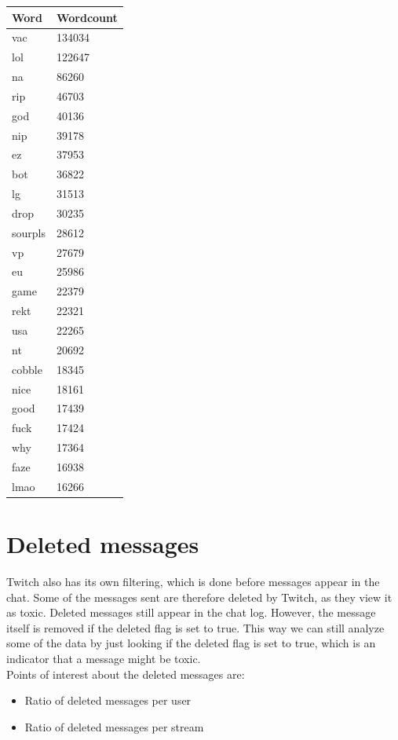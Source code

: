 \documentclass[final]{report}
\begin{document}
\begin{minipage}{.5\textwidth}
\centering
{}
\label{wordcounttabel}
\begin{tabular}{|l|l|}
\hline
Word    & Wordcount \\ \hline
vac     & 134034    \\ \hline
lol     & 122647    \\ \hline
na      & 86260     \\ \hline
rip     & 46703     \\ \hline
god     & 40136     \\ \hline
nip     & 39178     \\ \hline
ez      & 37953     \\ \hline
bot     & 36822     \\ \hline
lg      & 31513     \\ \hline
drop    & 30235     \\ \hline
sourpls & 28612     \\ \hline
vp      & 27679     \\ \hline
eu      & 25986     \\ \hline
game    & 22379     \\ \hline
rekt    & 22321     \\ \hline
usa     & 22265     \\ \hline
nt      & 20692     \\ \hline
cobble  & 18345     \\ \hline
nice    & 18161     \\ \hline
good    & 17439     \\ \hline
fuck    & 17424     \\ \hline
why     & 17364     \\ \hline
faze    & 16938     \\ \hline
lmao    & 16266     \\ \hline
\end{tabular}

\end{minipage}

\section{Deleted messages}

Twitch also has its own filtering, which is done before messages appear in the chat. Some of the messages sent are therefore deleted by Twitch, as they view it as toxic. Deleted messages still appear in the chat log. However, the message itself is removed if the deleted flag is set to true. This way we can still analyze some of the data by just looking if the deleted flag is set to true, which is an indicator that a message might be toxic.\\
Points of interest about the deleted messages are:
\begin{itemize}
	\item Ratio of deleted messages per user
	\item Ratio of deleted messages per stream
\end{itemize}
\end{document}
